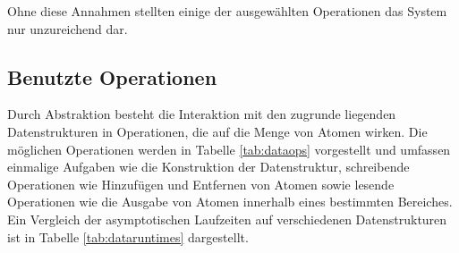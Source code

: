 Ohne diese Annahmen stellten einige der ausgewählten Operationen das System nur unzureichend dar.

\subsection{Benutzte Operationen}

Durch Abstraktion besteht die Interaktion mit den zugrunde liegenden Datenstrukturen in Operationen, die auf die Menge von Atomen wirken.
Die möglichen Operationen werden in Tabelle \ref{tab:dataops} vorgestellt und umfassen einmalige Aufgaben wie die Konstruktion der Datenstruktur, schreibende Operationen wie Hinzufügen und Entfernen von Atomen sowie lesende Operationen wie die Ausgabe von Atomen innerhalb eines bestimmten Bereiches.
Ein Vergleich der asymptotischen Laufzeiten auf verschiedenen Datenstrukturen ist in Tabelle \ref{tab:dataruntimes} dargestellt.

